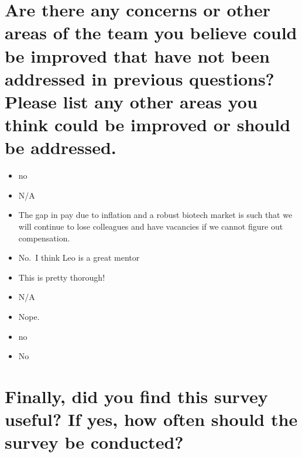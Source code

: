 \documentclass[
]{book}
\providecommand{\tightlist}{%
  \setlength{\itemsep}{0pt}\setlength{\parskip}{0pt}}
\begin{document}
\hypertarget{are-there-any-concerns-or-other-areas-of-the-team-you-believe-could-be-improved-that-have-not-been-addressed-in-previous-questions-please-list-any-other-areas-you-think-could-be-improved-or-should-be-addressed.}{%
\section{Are there any concerns or other areas of the team you believe could be improved that have not been addressed in previous questions? Please list any other areas you think could be improved or should be addressed.}\label{are-there-any-concerns-or-other-areas-of-the-team-you-believe-could-be-improved-that-have-not-been-addressed-in-previous-questions-please-list-any-other-areas-you-think-could-be-improved-or-should-be-addressed.}}

\begin{itemize}
\tightlist
\item
  no
\item
  N/A
\item
  The gap in pay due to inflation and a robust biotech market is such that we will continue to lose colleagues and have vacancies if we cannot figure out compensation.
\item
  No.~I think Leo is a great mentor
\item
  This is pretty thorough!
\item
  N/A
\item
  Nope.
\item
  no
\item
  No
\end{itemize}

\hypertarget{finally-did-you-find-this-survey-useful-if-yes-how-often-should-the-survey-be-conducted}{%
\section{Finally, did you find this survey useful? If yes, how often should the survey be conducted?}\label{finally-did-you-find-this-survey-useful-if-yes-how-often-should-the-survey-be-conducted}}
\end{document}
